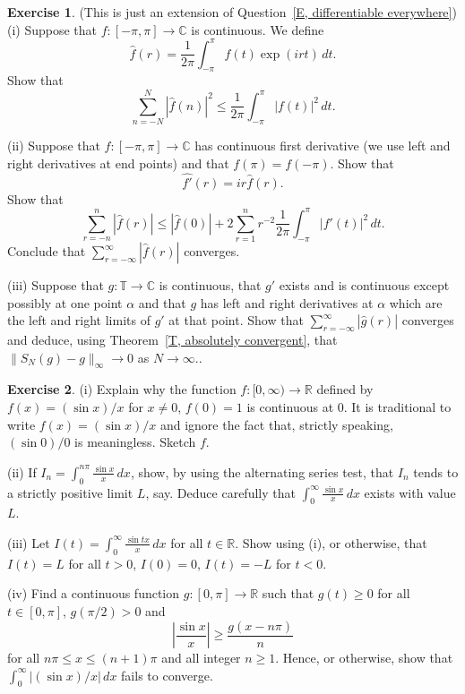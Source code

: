 \documentclass[12pt]{article}
\theoremstyle{definition}
\newtheorem{question}{Exercise}[section]
\begin{document}
\begin{question}\label{E, Kahane nice}
(This is just an extension of Question~\ref{E, differentiable everywhere}) 
(i) Suppose that  $f:[-\pi,\pi]\rightarrow{\mathbb C}$
is continuous. We define
\[\hat{f}(r)=\frac{1}{2\pi}\int_{-\pi}^{\pi}f(t)\exp(irt)\,dt.\]
Show that
\[\sum_{n=-N}^{N}|\hat{f}(n)|^{2}\leq
\frac{1}{2\pi}\int_{-\pi}^{\pi}|f(t)|^{2}\,dt.\]

(ii) Suppose that  $f:[-\pi,\pi]\rightarrow{\mathbb C}$
has continuous first derivative (we use left and right
derivatives at end points) and that $f(\pi)=f(-\pi)$. Show that
\[\widehat{f'}(r)=ir\hat{f}(r).\]
Show that
\[\sum_{r=-n}^{n}|\hat{f}(r)|\leq |\hat{f}(0)|
+2\sum_{r=1}^{n}r^{-2}\frac{1}{2\pi}\int_{-\pi}^{\pi}|f'(t)|^{2}\,dt.\]
Conclude that $\sum_{r=-\infty}^{\infty}|\hat{f}(r)|$ converges.

(iii) Suppose that  $g:{\mathbb T}\rightarrow{\mathbb C}$
is continuous, that $g'$ exists and is continuous
except possibly at one point $\alpha$ and that
$g$ has left and right derivatives at $\alpha$ which
are the left and right limits of $g'$ at that point.
Show that $\sum_{r=-\infty}^{\infty}|\hat{g}(r)|$ converges
and deduce, using Theorem~\ref{T, absolutely convergent}, that
$\|S_{N}(g)-g\|_{\infty}\rightarrow 0$ as $N\rightarrow\infty$..
\end{question}
\begin{question}\label{Q, infinite Dirichlet 1}
(i) Explain why the function $f:[0,\infty)\rightarrow{\mathbb R}$
defined by $f(x)=(\sin x)/x$ for $x\neq 0$, $f(0)=1$ is continuous
at $0$. It is traditional to write $f(x)=(\sin x)/x$
and ignore the fact that, strictly speaking, $(\sin 0)/0$
is meaningless. Sketch $f$.

(ii) If ${\displaystyle I_{n}=\int_{0}^{n\pi}\frac{\sin x}{x}\,dx}$,
show, by using the alternating series test, that $I_{n}$
tends to a strictly positive limit $L$, say. Deduce carefully
that ${\displaystyle \int_{0}^{\infty}\frac{\sin x}{x}\,dx}$
exists with value $L$.

(iii) Let ${\displaystyle
I(t)=\int_{0}^{\infty}\frac{\sin tx}{x}\,dx}$ for all $t\in{\mathbb R}$.
Show using (i), or otherwise, that
$I(t)=L$ for all $t>0$, $I(0)=0$, $I(t)=-L$ for $t<0$.

(iv) Find a  continuous function $g:[0,\pi]\rightarrow{\mathbb R}$
such that $g(t)\geq 0$ for all $t\in[0,\pi]$, $g(\pi/2)>0$
and
\[\left|\frac{\sin x}{x}\right|\geq \frac{g(x-n\pi)}{n}\]
for all $n\pi\leq x\leq(n+1)\pi$ and all integer $n\geq 1$.
Hence, or otherwise, show that $\int_{0}^{\infty}|(\sin x)/x|\,dx$
fails to converge.
\end{question}
\end{document}
